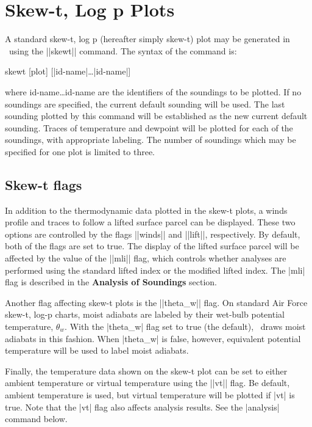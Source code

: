 \section{Skew-t, Log p Plots}
A standard skew-t, log p (hereafter simply skew-t) plot may be generated 
in \suds\ using the ||skewt|| command.  The syntax of the command is:
\begin{example}
	skewt [plot] [|id-name|\ldots|id-name|]
\end{example}
where {\pf id-name\ldots id-name} are the identifiers of the 
soundings to be plotted.  If no soundings are specified, the current default
sounding will be used.  
The last sounding plotted by this command will be established as the new 
current default sounding.  Traces of temperature and dewpoint will be plotted 
for each of the soundings, with appropriate labeling.  The number of soundings 
which may be specified for one plot is limited to three. 

\subsection{Skew-t flags}
In addition to the thermodynamic data plotted in the skew-t plots, a winds
profile and traces to follow a lifted surface parcel can be displayed.  These
two options are controlled by the flags ||winds|| and ||lift||, respectively.
By default, both of the flags are set to true.  The display of the lifted 
surface parcel will be affected by the value of the ||mli|| flag, which 
controls whether analyses are performed using the standard lifted index or the
modified lifted index.  The |mli| flag is described in the {\bf Analysis of
Soundings} section. 

Another flag affecting skew-t plots is the ||theta_w|| flag.  On standard
Air Force skew-t, log-p charts, moist adiabats are labeled by their
wet-bulb potential temperature, $\theta_w$.  With the |theta_w| flag
set to true (the default), \suds\ draws moist adiabats in this fashion.
When |theta_w| is false, however, equivalent potential temperature
will be used to label moist adiabats.

Finally, the temperature data shown on the skew-t plot can be set to
either ambient temperature or virtual temperature using the ||vt|| flag.
Be default, ambient temperature is used, but virtual temperature will be
plotted if |vt| is true.  Note that the |vt| flag also affects analysis
results.  See the |analysis| command below.

